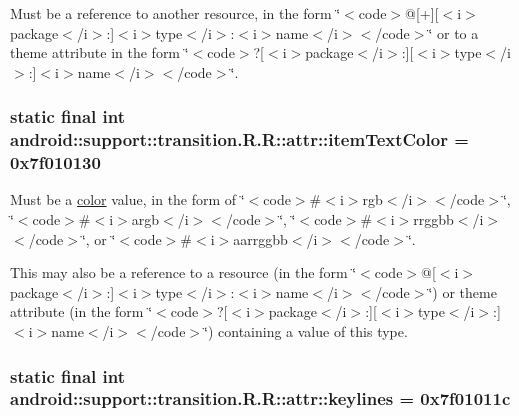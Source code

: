Must be a reference to another resource, in the form \char`\"{}$<$code$>$@\mbox{[}+\mbox{]}\mbox{[}$<$i$>$package$<$/i$>$:\mbox{]}$<$i$>$type$<$/i$>$:$<$i$>$name$<$/i$>$$<$/code$>$\char`\"{} or to a theme attribute in the form \char`\"{}$<$code$>$?\mbox{[}$<$i$>$package$<$/i$>$:\mbox{]}\mbox{[}$<$i$>$type$<$/i$>$:\mbox{]}$<$i$>$name$<$/i$>$$<$/code$>$\char`\"{}. \hypertarget{classandroid_1_1support_1_1transition_1_1_r_1_1attr_2be6a5b1db7aac1be85b61a0a81d6a21}{
\subsubsection[{itemTextColor}]{\setlength{\rightskip}{0pt plus 5cm}static final int android::support::transition.R.R::attr::itemTextColor = 0x7f010130}}
\label{classandroid_1_1support_1_1transition_1_1_r_1_1attr_2be6a5b1db7aac1be85b61a0a81d6a21}


Must be a \hyperlink{classandroid_1_1support_1_1transition_1_1_r_1_1color}{color} value, in the form of \char`\"{}$<$code$>$\#$<$i$>$rgb$<$/i$>$$<$/code$>$\char`\"{}, \char`\"{}$<$code$>$\#$<$i$>$argb$<$/i$>$$<$/code$>$\char`\"{}, \char`\"{}$<$code$>$\#$<$i$>$rrggbb$<$/i$>$$<$/code$>$\char`\"{}, or \char`\"{}$<$code$>$\#$<$i$>$aarrggbb$<$/i$>$$<$/code$>$\char`\"{}. 

This may also be a reference to a resource (in the form \char`\"{}$<$code$>$@\mbox{[}$<$i$>$package$<$/i$>$:\mbox{]}$<$i$>$type$<$/i$>$:$<$i$>$name$<$/i$>$$<$/code$>$\char`\"{}) or theme attribute (in the form \char`\"{}$<$code$>$?\mbox{[}$<$i$>$package$<$/i$>$:\mbox{]}\mbox{[}$<$i$>$type$<$/i$>$:\mbox{]}$<$i$>$name$<$/i$>$$<$/code$>$\char`\"{}) containing a value of this type. \hypertarget{classandroid_1_1support_1_1transition_1_1_r_1_1attr_3b26d81a9d1e46f3df549134e8cafca7}{
\subsubsection[{keylines}]{\setlength{\rightskip}{0pt plus 5cm}static final int android::support::transition.R.R::attr::keylines = 0x7f01011c}}
\label{classandroid_1_1support_1_1transition_1_1_r_1_1attr_3b26d81a9d1e46f3df549134e8cafca7}


